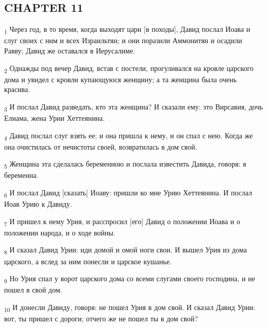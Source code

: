 \subsection{CHAPTER 11}
\begin{tcolorbox}
\textsubscript{1} Через год, в то время, когда выходят цари [в походы], Давид послал Иоава и слуг своих с ним и всех Израильтян; и они поразили Аммонитян и осадили Равву; Давид же оставался в Иерусалиме.
\end{tcolorbox}
\begin{tcolorbox}
\textsubscript{2} Однажды под вечер Давид, встав с постели, прогуливался на кровле царского дома и увидел с кровли купающуюся женщину; а та женщина была очень красива.
\end{tcolorbox}
\begin{tcolorbox}
\textsubscript{3} И послал Давид разведать, кто эта женщина? И сказали ему: это Вирсавия, дочь Елиама, жена Урии Хеттеянина.
\end{tcolorbox}
\begin{tcolorbox}
\textsubscript{4} Давид послал слуг взять ее; и она пришла к нему, и он спал с нею. Когда же она очистилась от нечистоты своей, возвратилась в дом свой.
\end{tcolorbox}
\begin{tcolorbox}
\textsubscript{5} Женщина эта сделалась беременною и послала известить Давида, говоря: я беременна.
\end{tcolorbox}
\begin{tcolorbox}
\textsubscript{6} И послал Давид [сказать] Иоаву: пришли ко мне Урию Хеттеянина. И послал Иоав Урию к Давиду.
\end{tcolorbox}
\begin{tcolorbox}
\textsubscript{7} И пришел к нему Урия, и расспросил [его] Давид о положении Иоава и о положении народа, и о ходе войны.
\end{tcolorbox}
\begin{tcolorbox}
\textsubscript{8} И сказал Давид Урии: иди домой и омой ноги свои. И вышел Урия из дома царского, а вслед за ним понесли и царское кушанье.
\end{tcolorbox}
\begin{tcolorbox}
\textsubscript{9} Но Урия спал у ворот царского дома со всеми слугами своего господина, и не пошел в свой дом.
\end{tcolorbox}
\begin{tcolorbox}
\textsubscript{10} И донесли Давиду, говоря: не пошел Урия в дом свой. И сказал Давид Урии: вот, ты пришел с дороги; отчего же не пошел ты в дом свой?
\end{tcolorbox}
